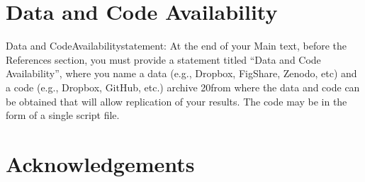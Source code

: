 \documentclass[11pt, a4paper, titlepage]{article}
\begin{document}
    \section*{Data and Code Availability}
    Data  and  CodeAvailabilitystatement:  At  the  end  of  your  Main  text,  before  the  References section, you must provide a statement titled “Data and Code Availability”, where you name a data (e.g., Dropbox, FigShare, Zenodo, etc) and a code (e.g., Dropbox, GitHub, etc.) archive 
    20from where the data and code can be obtained that will allow replication of your results. The code may be in the form of a single script file.
    
    \clearpage
    \section*{Acknowledgements}
    

    
\end{document}
